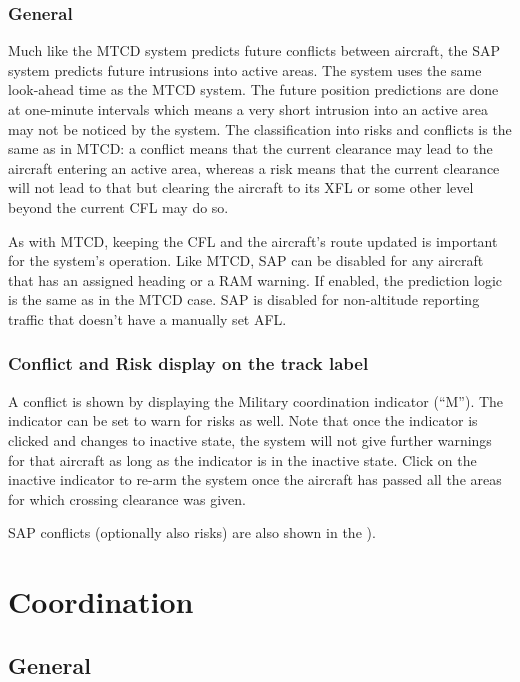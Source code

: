 \documentclass[11pt,a4paper,oldfontcommands]{memoir}
\begin{document}
\subsection*{General}

Much like the MTCD system predicts future conflicts between aircraft, the SAP system predicts future intrusions into active areas. The system uses the same look-ahead time as the MTCD system. The future position predictions are done at one-minute intervals which means a very short intrusion into an active area may not be noticed by the system. The classification into risks and conflicts is the same as in MTCD: a conflict means that the current clearance may lead to the aircraft entering an active area, whereas a risk means that the current clearance will not lead to that but clearing the aircraft to its XFL or some other level beyond the current CFL may do so.

As with MTCD, keeping the CFL and the aircraft’s route updated is important for the system’s operation. Like MTCD, SAP can be disabled for any aircraft that has an assigned heading or a RAM warning. If enabled, the prediction logic is the same as in the MTCD case. SAP is disabled for non-altitude reporting traffic that doesn’t have a manually set AFL.

\subsection*{Conflict and Risk display on the track label}

A conflict is shown by displaying the Military coordination indicator (“M”). The indicator can be set to warn for risks as well. Note that once the indicator is clicked and changes to inactive state, the system will not give further warnings for that aircraft as long as the indicator is in the inactive state. Click on the inactive indicator to re-arm the system once the aircraft has passed all the areas for which crossing clearance was given.

SAP conflicts (optionally also risks) are also shown in the \textit{}).

\chapter{Coordination}

\section{General}
\end{document}
